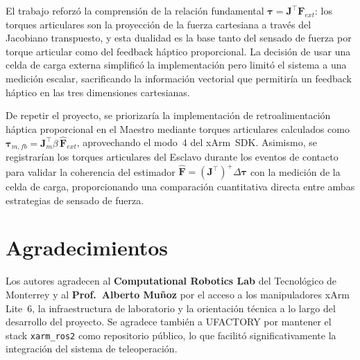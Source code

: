 \documentclass[journal,10pt,twoside]{IEEEtran}
\begin{document}
El trabajo reforzó la comprensión de la relación fundamental
$\bm{\tau} = \bm{J}^\top \bm{F}_{ext}$: los torques articulares
son la proyección de la fuerza cartesiana a través del Jacobiano
transpuesto, y esta dualidad es la base tanto del sensado de
fuerza por torque articular como del feedback háptico proporcional.
La decisión de usar una celda de carga externa simplificó la
implementación pero limitó el sistema a una medición escalar,
sacrificando la información vectorial que permitiría un feedback
háptico en las tres dimensiones cartesianas.

De repetir el proyecto, se priorizaría la implementación de
retroalimentación háptica proporcional en el Maestro mediante
torques articulares calculados como
$\bm{\tau}_{m,fb} = \bm{J}_m^\top \beta\,\hat{\bm{F}}_{ext}$,
aprovechando el modo~4 del xArm~SDK. Asimismo, se registrarían los
torques articulares del Esclavo durante los eventos de contacto
para validar la coherencia del estimador
$\hat{\bm{F}} = (\bm{J}^\top)^+\Delta\bm{\tau}$ con la medición
de la celda de carga, proporcionando una comparación cuantitativa
directa entre ambas estrategias de sensado de fuerza.

\section*{Agradecimientos}

Los autores agradecen al \textbf{Computational Robotics Lab} del
Tecnológico de Monterrey y al \textbf{Prof.\ Alberto Muñoz} por
el acceso a los manipuladores xArm Lite~6, la infraestructura de
laboratorio y la orientación técnica a lo largo del desarrollo del
proyecto. Se agradece también a UFACTORY por mantener el stack
\texttt{xarm\_ros2} como repositorio público, lo que facilitó
significativamente la integración del sistema de teleoperación.
\end{document}
